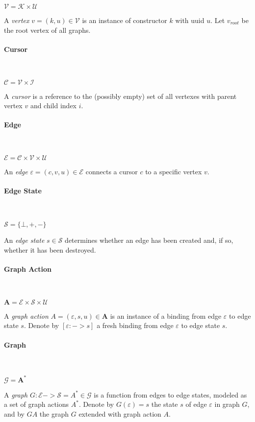 \documentclass[letterpaper,12pt]{report}
\def\C{\mathcal{C}}
\def\E{\mathcal{E}}
\def\G{\mathcal{G}}
\def\I{\mathcal{I}}
\def\K{\mathcal{K}}
\def\S{\mathcal{S}}
\def\U{\mathcal{U}}
\def\V{\mathcal{V}}
\def\e{\varepsilon}
\def\Abf{\textbf{A}}
\begin{document}
$\V = \K \times \U$

A \emph{vertex} $v = (k, u) \in \V$ is an instance of constructor $k$ with
uuid $u$. Let $v_{root}$ be the root vertex of all graphs.

\paragraph{Cursor} ~

$\C = \V \times \I$

A \emph{cursor} is a reference to the (possibly empty) set of all vertexes
with parent vertex $v$ and child index $i$.

\paragraph{Edge} ~

$\E = \C \times \V \times \U$

An \emph{edge} $\e = (c, v, u) \in \E$ connects a cursor $c$ to a specific
vertex $v$.

\paragraph{Edge State} ~

$\S = \{\bot,+,-\}$

An \emph{edge state} $s \in \S$ determines whether an edge has been created
and, if so, whether it has been destroyed.

\paragraph{Graph Action} ~

$\Abf = \E \times \S \times \U$

A \emph{graph action} $A = (\e,s,u) \in \Abf$ is an instance of a binding from
edge $\e$ to edge state $s$. Denote by $[\e :-> s]$ a fresh binding from edge
$\e$ to edge state $s$.

\paragraph{Graph} ~

$\G = \Abf^{*}$

A \emph{graph} $G : \E -> \S = A^{*} \in \G$ is a function from edges to edge
states, modeled as a set of graph actions $A^{*}$. Denote by $G(\e) = s$ the
state $s$ of edge $\e$ in graph $G$, and by $G A$ the graph $G$ extended with
graph action $A$.
\end{document}
